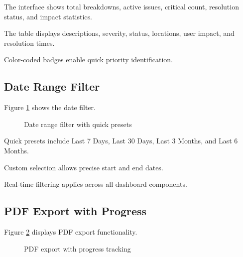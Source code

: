 The interface shows total breakdowns, active issues, critical count, resolution status, and impact statistics.

The table displays descriptions, severity, status, locations, user impact, and resolution times.

Color-coded badges enable quick priority identification.

\subsection{Date Range Filter}

Figure \ref{fig:sprint5-impl4} shows the date filter.

\begin{figure}[H]
\centering
{}
\caption{Date range filter with quick presets}
\label{fig:sprint5-impl4}
\end{figure}

Quick presets include Last 7 Days, Last 30 Days, Last 3 Months, and Last 6 Months.

Custom selection allows precise start and end dates.

Real-time filtering applies across all dashboard components.

\subsection{PDF Export with Progress}

Figure \ref{fig:sprint5-impl5} displays PDF export functionality.

\begin{figure}[H]
\centering
{}
\caption{PDF export with progress tracking}
\label{fig:sprint5-impl5}
\end{figure}

